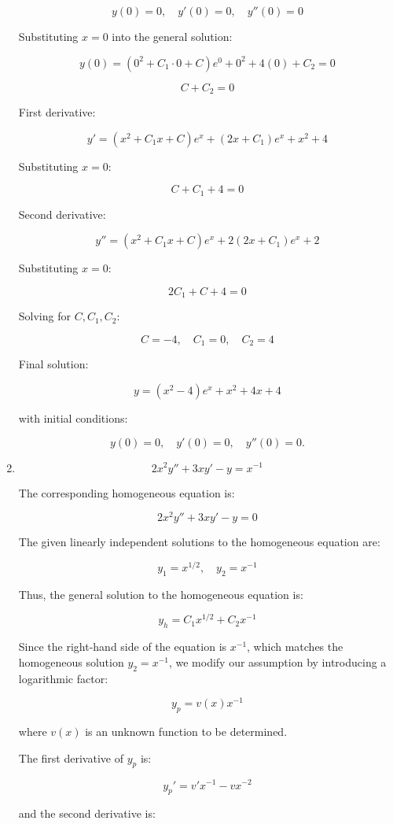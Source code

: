 \documentclass[12pt]{article}
\begin{document}
\begin{enumerate}
\[
y(0) = 0, \quad y'(0) = 0, \quad y''(0) = 0
\]

Substituting \( x = 0 \) into the general solution:

\[
y(0) = (0^2 + C_1 \cdot 0 + C)e^0 + 0^2 + 4(0) + C_2 = 0
\]

\[
C + C_2 = 0
\]

First derivative:

\[
y' = (x^2 + C_1 x + C) e^x + (2x + C_1) e^x + x^2 + 4
\]

Substituting \( x = 0 \):

\[
C + C_1 + 4 = 0
\]

Second derivative:

\[
y'' = (x^2 + C_1 x + C) e^x + 2(2x + C_1) e^x + 2
\]

Substituting \( x = 0 \):

\[
2C_1 + C + 4 = 0
\]

Solving for \( C, C_1, C_2 \):

\[
C = -4, \quad C_1 = 0, \quad C_2 = 4
\]

Final solution:

\[
y = (x^2 - 4)e^x + x^2 + 4x + 4
\]

with initial conditions:

\[
y(0) = 0, \quad y'(0) = 0, \quad y''(0) = 0.
\]

\item 
\[
2x^2 y'' + 3x y' - y = x^{-1}
\]

The corresponding homogeneous equation is:

\[
2x^2 y'' + 3x y' - y = 0
\]

The given linearly independent solutions to the homogeneous equation are:

\[
y_1 = x^{1/2}, \quad y_2 = x^{-1}
\]

Thus, the general solution to the homogeneous equation is:

\[
y_h = C_1 x^{1/2} + C_2 x^{-1}
\]

Since the right-hand side of the equation is \( x^{-1} \), which matches the homogeneous solution \( y_2 = x^{-1} \), we modify our assumption by introducing a logarithmic factor:

\[
y_p = v(x) x^{-1}
\]

where \( v(x) \) is an unknown function to be determined.

The first derivative of \( y_p \) is:

\[
y_p' = v' x^{-1} - v x^{-2}
\]

and the second derivative is:


\end{enumerate}
\end{document}
